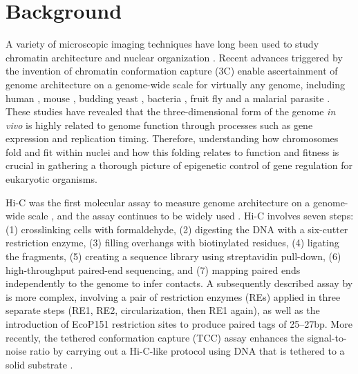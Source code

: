 \begin{abstract}{Abstract}
\textbf{Conclusion:} TM3C is a simple protocol for ascertaining genome
architecture and can be used to identify simultaneous contacts among three
or four loci. Application of TM3C to a near-haploid human cell line
revealed large-scale features of chromosomal organization and multi-way
chromatin contacts that preferentially link regions of open chromatin.

\textbf{Keywords:} genome architecture, chromatin conformation capture,
multi-locus chromatin contacts, near-haploid human cells, leukemia,
three-dimensional modeling.

\end{abstract}

\section*{Background}

A variety of microscopic imaging techniques have long been used to study
chromatin architecture and nuclear organization
\citep{langer-safer:immunological, manders:four-dimensional,
cremer:multicolor}. Recent advances triggered by the invention of chromatin
conformation capture (3C) enable ascertainment of genome architecture on a
genome-wide scale for virtually any genome, including human
\citep{lieberman-aiden:comprehensive, dixon:topological, jin:high-resolution},
mouse \citep{zhang:spatial, dixon:topological}, budding yeast
\citep{duan:three}, bacteria \citep{umbarger:three-dimensional}, fruit fly
\citep{sexton:three-dimensional} and a malarial parasite
\citep{ay:three-dimensional}. These studies have revealed that the
three-dimensional form of the genome {\em in vivo} is highly related to genome
function through processes such as gene expression and replication timing.
Therefore, understanding how chromosomes fold and fit within nuclei and how
this folding relates to function and fitness is crucial in gathering a
thorough picture of epigenetic control of gene regulation for eukaryotic
organisms.


Hi-C was the first molecular assay to measure genome architecture on a genome-wide
scale \citep{lieberman-aiden:comprehensive}, and the assay continues to
be widely used \citep{jin:high-resolution, naumova:organization, ay:three-dimensional}.
Hi-C involves seven steps: (1) crosslinking cells with
formaldehyde, (2) digesting the DNA with a six-cutter restriction enzyme, (3)
filling overhangs with biotinylated residues, (4) ligating the fragments, (5)
creating a sequence library using streptavidin pull-down, (6) high-throughput
paired-end sequencing, and (7) mapping paired ends independently to the genome
to infer contacts. A subsequently described assay by \citet{duan:three} is more
complex, involving a pair of restriction enzymes (REs) applied in three separate
steps (RE1, RE2, circularization, then RE1 again), as well as the introduction
of EcoP151 restriction sites to produce paired tags of 25--27bp. More recently,
the tethered conformation capture (TCC) assay enhances the signal-to-noise
ratio by carrying out a Hi-C-like protocol using DNA that is tethered to a
solid substrate \citep{kalhor:genome}.

